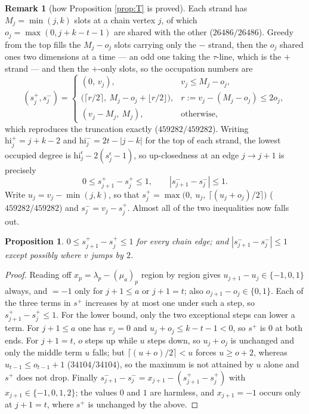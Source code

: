 \documentclass[11pt,reqno]{amsart}
\theoremstyle{plain}
\newtheorem{proposition}[theorem]{Proposition}
\theoremstyle{definition}
\newtheorem{remark}[theorem]{Remark}
\newcommand{\la}{\lambda}
\begin{document}
\begin{remark}[how Proposition \ref{prop:T} is proved]
Each strand has $M_j=\min(j,k)$ slots at a chain vertex $j$, of which
$o_j=\max(0,j+k-t-1)$ are shared with the other ($26486/26486$).  Greedy from
the top fills the $M_j-o_j$ slots carrying only the $-$ strand, then the $o_j$
shared ones two dimensions at a time --- an odd one taking the $\tau$-line,
which is the $+$ strand --- and then the $+$-only slots, so the occupation
numbers are
\[
   (s^{+}_j,s^{-}_j)=
   \begin{cases}
     (0,\,v_j), & v_j\le M_j-o_j,\\[2pt]
     \bigl(\lceil r/2\rceil,\ M_j-o_j+\lfloor r/2\rfloor\bigr),
       & r:=v_j-(M_j-o_j)\le 2o_j,\\[2pt]
     (v_j-M_j,\ M_j), & \text{otherwise,}
   \end{cases}
\]
which reproduces the truncation exactly ($459282/459282$).  Writing
$\mathrm{hi}^{+}_j=j+k-2$ and $\mathrm{hi}^{-}_j=2t-|j-k|$ for the top of each
strand, the lowest occupied degree is
$\mathrm{hi}^{\epsilon}_j-2(s^{\epsilon}_j-1)$, so up-closedness at an edge
$j\to j+1$ is precisely
\[
   0\le s^{+}_{j+1}-s^{+}_j\le1,
   \qquad |s^{-}_{j+1}-s^{-}_j|\le1 .
\]
Write $u_j=v_j-\min(j,k)$, so that
$s^{+}_j=\max\bigl(0,\ u_j,\ \lceil(u_j+o_j)/2\rceil\bigr)$
($459282/459282$) and $s^{-}_j=v_j-s^{+}_j$.  Almost all of the two inequalities
now falls out.

\begin{proposition}\label{prop:incr}
$0\le s^{+}_{j+1}-s^{+}_j\le1$ for every chain edge; and
$|s^{-}_{j+1}-s^{-}_j|\le1$ except possibly where $v$ jumps by $2$.
\end{proposition}

\begin{proof}
Reading off $x_p=\la_p-(\mu_a)_p$ region by region gives
$u_{j+1}-u_j\in\{-1,0,1\}$ always, and $=-1$ only for $j+1\le a$ or $j+1=t$;
also $o_{j+1}-o_j\in\{0,1\}$.  Each of the three terms in $s^{+}$ increases by
at most one under such a step, so $s^{+}_{j+1}-s^{+}_j\le1$.  For the lower
bound, only the two exceptional steps can lower a term.  For $j+1\le a$ one has
$v_j=0$ and $u_j+o_j\le k-t-1<0$, so $s^{+}$ is $0$ at both ends.  For $j+1=t$,
$o$ steps up while $u$ steps down, so $u_j+o_j$ is unchanged and only the
middle term $u$ falls; but $\lceil(u+o)/2\rceil<u$ forces $u\ge o+2$, whereas
$u_{t-1}\le o_{t-1}+1$ ($34104/34104$), so the maximum is not attained by $u$
alone and $s^{+}$ does not drop.  Finally $s^{-}_{j+1}-s^{-}_j=x_{j+1}-
(s^{+}_{j+1}-s^{+}_j)$ with $x_{j+1}\in\{-1,0,1,2\}$; the values $0$ and $1$ are
harmless, and $x_{j+1}=-1$ occurs only at $j+1=t$, where $s^{+}$ is unchanged by
the above.
\end{proof}


\end{remark}
\end{document}
